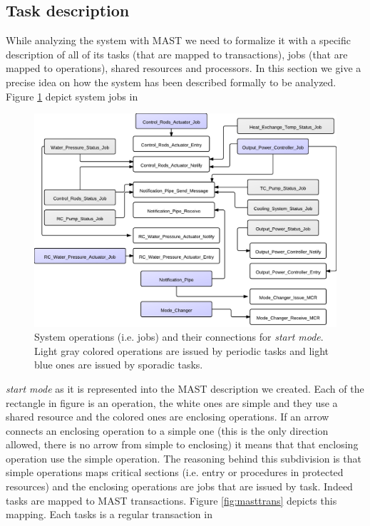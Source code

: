 \documentclass[10pt,a4paper]{report}
\begin{document}
\subsection{Task description}
While analyzing the system with MAST we need to formalize it with a specific 
description of all of its tasks (that are mapped to transactions), 
jobs (that are mapped to operations), shared resources and processors. In this 
section we give a precise idea on how the system has been described formally to
be analyzed. Figure \ref{fig:mstartjob} depict system jobs in 
\begin{figure}[htb]
\centering 
\includegraphics[width=\textwidth]{diagrams/Transactions}
\caption{
    System operations (i.e. jobs) and their connections for \emph{start mode}.
    Light gray colored operations are issued by periodic tasks and light blue 
    ones are issued by sporadic tasks. 
}
\label{fig:mstartjob}
\end{figure}
\emph{start mode} as it is represented into the MAST description we created. 
Each of the rectangle in figure is an operation, the white ones are simple and
they use a shared resource and the colored ones are enclosing operations. If an
arrow connects an enclosing operation to a simple one (this is the only 
direction allowed, there is no arrow from simple to enclosing) it means that 
that enclosing operation use the simple operation. The reasoning behind this 
subdivision is that simple operations maps critical sections (i.e. entry or 
procedures in protected resources) and the enclosing operations are jobs that
are issued by task. Indeed tasks are mapped to MAST transactions. Figure 
\ref{fig:masttrans} depicts this mapping. Each tasks is a regular transaction in 
\end{document}
